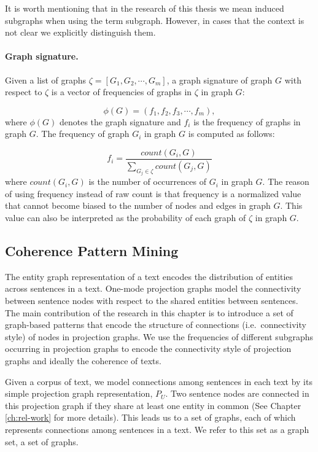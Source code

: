 It is worth mentioning that in the research of this thesis we mean induced subgraphs when using the term subgraph. 
However, in cases that the context is not clear we explicitly distinguish them. 

\paragraph{Graph signature.} 
Given a list of graphs $ \zeta  = \left[ G_1, G_2, \cdots , G_m \right]$,  a graph signature of graph $G$ with respect to $\zeta$ is a vector of frequencies of graphs in $\zeta$ in graph $G$:

\begin{equation}
	\phi \left( G \right) = \left( f_1, f_2, f_3, \cdots, f_m \right),
\end{equation}
where  $\phi \left( G \right)$ denotes the graph signature and $f_i$ is the frequency of graphs in graph $G$. 
The frequency of graph $G_i$ in graph $G$ is computed as follows:

\begin{equation}
 f_i = \frac{count(G_i, G)}{\sum_{G_j \in \zeta}{count(G_j, G)}}
\end{equation}
where $count(G_i, G)$ is the number of occurrences of $G_i$ in graph $G$. 
The reason of using frequency instead of raw count is that frequency is a normalized value that cannot become biased to the number of nodes and edges in graph $G$. 
This value can also be interpreted as the probability of each graph of $\zeta$ in graph $G$.  

\subsection{Coherence Pattern Mining}

The entity graph representation of a text encodes the distribution of entities across sentences in a text. 
One-mode projection graphs model the connectivity between sentence nodes with respect to the shared entities between sentences. 
The main contribution of the research in this chapter is to introduce a set of graph-based patterns that encode the structure of connections (i.e.\ connectivity style) of nodes in projection graphs.  
We use the frequencies of different subgraphs occurring in projection graphs to encode the connectivity style of projection graphs and ideally the coherence of texts. 

Given a corpus of text, we model connections among sentences in each text by its simple projection graph representation, $P_U$. 
Two sentence nodes are connected in this projection graph if they share at least one entity in common (See Chapter \ref{ch:rel-work} for more details).  
This leads us to a set of graphs, each of which represents connections among sentences in a text.   
We refer to this set as a graph set, a set of graphs. 

